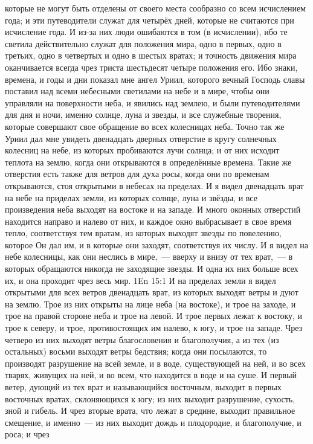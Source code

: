 которые не могут быть отделены от своего места сообразно со всем исчислением
года; и эти путеводители служат для четырёх дней, которые не считаются при
исчисление года.
И из-за них люди ошибаются в том (в исчислении), ибо те светила
действительно служат для положения мира, одно в первых, одно в третьих, одно в
четвертых и одно в шестых вратах; и точность движения мира оканчивается всегда
чрез триста шестьдесят четыре положения его.
Ибо знаки, времена, и годы и дни показал мне ангел Уриил, которого
вечный Господь славы поставил над всеми небесными светилами на небе и в мире,
чтобы они управляли на поверхности неба, и явились над землею, и были
путеводителями для дня и ночи, именно солнце, луна и звезды, и все служебные
творения, которые совершают свое обращение во всех колесницах неба.
Точно так же Уриил дал мне увидеть двенадцать дверных отверстие в
кругу солнечных колесниц на небе, из которых пробиваются лучи солнца; и от них
исходит теплота на землю, когда они открываются в определённые времена.
Такие же отверстия есть также для ветров для духа росы, когда они по
временам открываются, стоя открытыми в небесах на пределах.
И я видел двенадцать врат на небе на приделах земли, из которых
солнце, луна и звёзды, и все произведения неба выходят на востоке и на западе.
И много оконных отверстий находится направо и налево от них, и каждое
окно выбрасывает в свое время тепло, соответствуя тем вратам, из которых
выходят звезды по повелению, которое Он дал им, и в которые они заходят,
соответствуя их числу.
И я видел на небе колесницы, как они неслись в мире,~--- вверху и внизу
от тех врат,~--- в которых обращаются никогда не заходящие звезды.
И одна их них больше всех их, и она проходит чрез весь мир.
\vs 1En 15:1
И на пределах земли я видел открытыми для всех ветров двенадцать
врат, из которых выходят ветры и дуют на землю.
Трое из них открыты на лице неба (на востоке), и трое на заходе, и трое
на правой стороне неба и трое на левой.
И трое первых лежат к востоку, и трое к северу, и трое, противостоящих
им налево, к югу, и трое на западе.
Чрез четверо из них выходят ветры благословения и благополучия, а из
тех (из остальных) восьми выходят ветры бедствия; когда они посылаются, то
производят разрушение на всей земле, и в воде, существующей на ней, и во всех
тварях, живущих на ней, и во всем, что находится в воде и на суше.
И первый ветер, дующий из тех врат и называющийся восточным,
выходит в первых восточных вратах, склоняющихся к югу; из них выходит
разрушение, сухость, зной и гибель.
И чрез вторые врата, что лежат в средине, выходит правильное смещение,
и именно~--- из них выходит дождь и плодородие, и благополучие, и роса; и чрез
